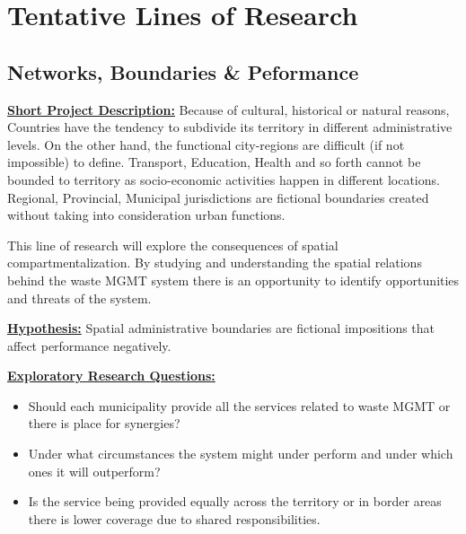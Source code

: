 \section{Tentative Lines of Research}

\subsection{Networks, Boundaries \& Peformance}

\textbf{\underline {Short Project Description:}} Because of cultural, historical or natural reasons, Countries have the tendency to subdivide its territory in different administrative levels. On the other hand, the functional city-regions are difficult (if not impossible) to define. Transport, Education, Health and so forth cannot be bounded to territory as socio-economic activities happen in different locations. Regional, Provincial, Municipal jurisdictions are fictional boundaries created without taking into consideration urban functions.  \par
This line of research will explore the consequences of spatial compartmentalization. By studying and understanding the spatial relations behind the waste MGMT system there is an opportunity to identify opportunities and threats of the system. \par

\textbf{\underline {Hypothesis:}}  Spatial administrative boundaries are fictional impositions that affect performance negatively.  \par

\textbf{\underline {Exploratory Research Questions: }} 
\begin{itemize}
    \item Should each municipality provide all the services related to waste MGMT or there is place for synergies? 
    \item Under what circumstances the system might under perform and under which ones it will outperform?
    \item Is the service being provided equally across the territory or in border areas there is lower coverage due to shared responsibilities. 
\end{itemize}


